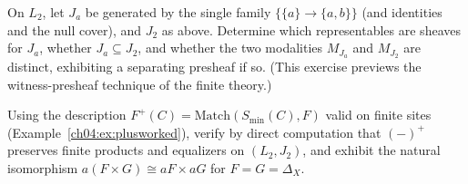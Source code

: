 \begin{exercise}\label{ch04:exr:twotopologies}
On $L_2$, let $J_a$ be generated by the single family $\{\{a\}\to\{a,b\}\}$
(and identities and the null cover), and $J_2$ as above. Determine which
representables are sheaves for $J_a$, whether $J_a\subseteq J_2$, and whether
the two modalities $M_{J_a}$ and $M_{J_2}$ are distinct, exhibiting a
separating presheaf if so. (This exercise previews the witness-presheaf
technique of the finite theory.)
\end{exercise}

\begin{exercise}\label{ch04:exr:leftexact}
Using the description $F^{+}(C)=\mathrm{Match}(S_{\min}(C),F)$ valid on
finite sites (Example~\ref{ch04:ex:plusworked}), verify by direct computation
that $(-)^{+}$ preserves finite products and equalizers on
$(L_2,J_2)$, and exhibit the natural isomorphism
$a(F\times G)\cong aF\times aG$ for $F=G=\Delta_X$.
\end{exercise}
